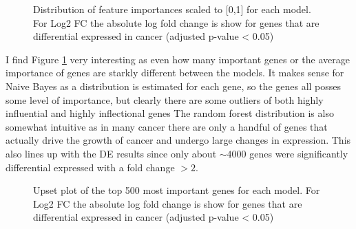 \FloatBarrier
\begin{figure}[htb!]
    \center
    \caption{Distribution of feature importances scaled to [0,1] for each model. For Log2 FC the absolute log fold change is show for genes that are differential expressed in cancer (adjusted p-value < 0.05)}
    \label{dist}
\end{figure}
\FloatBarrier
I find Figure \ref{dist} very interesting as even how many important genes or the average importance of genes are starkly different between the models.
It makes sense for Naive Bayes as a distribution is estimated for each gene, so the genes all posses some level of importance, but clearly there are some outliers of both highly influential and highly inflectional genes
The random forest distribution is also somewhat intuitive as in many cancer there are only a handful of genes that actually drive the growth of cancer and undergo large changes in expression.
This also lines up with the DE results since only about $\sim 4000$ genes were significantly differential expressed with a fold change $> 2$.
\FloatBarrier
\begin{figure}[htb!]
    \center
    \caption{Upset plot of the top 500 most important genes for each model. For Log2 FC the absolute log fold change is show for genes that are differential expressed in cancer (adjusted p-value < 0.05)}
    \label{ugene}
\end{figure}
